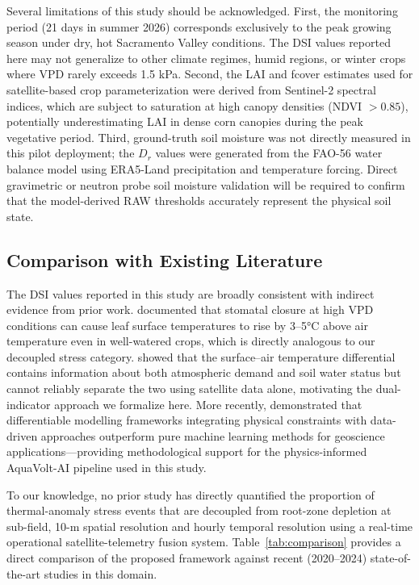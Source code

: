 \documentclass[review,12pt]{elsarticle}
\begin{document}
Several limitations of this study should be acknowledged. First, the monitoring period (21 days in summer 2026) corresponds exclusively to the peak growing season under dry, hot Sacramento Valley conditions. The DSI values reported here may not generalize to other climate regimes, humid regions, or winter crops where VPD rarely exceeds 1.5 kPa. Second, the LAI and fcover estimates used for satellite-based crop parameterization were derived from Sentinel-2 spectral indices, which are subject to saturation at high canopy densities (NDVI $> 0.85$), potentially underestimating LAI in dense corn canopies during the peak vegetative period. Third, ground-truth soil moisture was not directly measured in this pilot deployment; the $D_r$ values were generated from the FAO-56 water balance model using ERA5-Land precipitation and temperature forcing. Direct gravimetric or neutron probe soil moisture validation will be required to confirm that the model-derived RAW thresholds accurately represent the physical soil state.

\subsection{Comparison with Existing Literature}
\label{subsec:literature_comparison}

The DSI values reported in this study are broadly consistent with indirect evidence from prior work. \citet{jones2004assessment} documented that stomatal closure at high VPD conditions can cause leaf surface temperatures to rise by 3--5°C above air temperature even in well-watered crops, which is directly analogous to our decoupled stress category. \citet{moran1994combining} showed that the surface--air temperature differential contains information about both atmospheric demand and soil water status but cannot reliably separate the two using satellite data alone, motivating the dual-indicator approach we formalize here. More recently, \citet{shen2023deephydrology} demonstrated that differentiable modelling frameworks integrating physical constraints with data-driven approaches outperform pure machine learning methods for geoscience applications---providing methodological support for the physics-informed AquaVolt-AI pipeline used in this study.

To our knowledge, no prior study has directly quantified the proportion of thermal-anomaly stress events that are decoupled from root-zone depletion at sub-field, 10-m spatial resolution and hourly temporal resolution using a real-time operational satellite-telemetry fusion system. Table~\ref{tab:comparison} provides a direct comparison of the proposed framework against recent (2020--2024) state-of-the-art studies in this domain.
\end{document}
